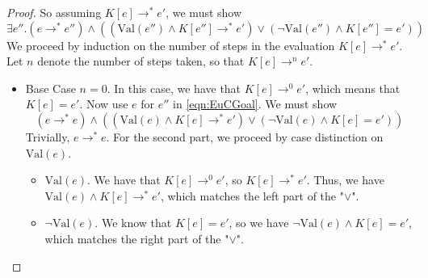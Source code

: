 \documentclass[twoside,11pt,openright]{report}
\theoremstyle{definition}
\newcommand{\expr}{e}
\newcommand{\elctx}{K}
\newcommand{\step}{\rightarrow}
\newcommand{\stepS}{\rightarrow^*}
\newcommand{\Val}[1]{\mathrm{Val}(#1)}
\begin{document}
\begin{proof}
  So assuming $\elctx[\expr] \stepS \expr'$, we must show
  \begin{equation}\label{eqn:EuCGoal}
    \exists \expr'' . (\expr \stepS \expr'') \land 
    \left( (\Val{\expr''} \land \elctx[\expr''] \stepS \expr') \lor
    (\neg \Val{\expr''} \land \elctx[\expr''] = \expr') \right)
  \end{equation}
  We proceed by induction on the number of steps in the evaluation $\elctx[\expr] \stepS \expr'$. Let $n$ denote the number of steps taken, so that $\elctx[\expr] \step^n \expr'$.
  \begin{itemize}
    \item Base Case $n = 0$. In this case, we have that $\elctx[\expr] \step^0 \expr'$, which means that $\elctx[\expr] = \expr'$. Now use $\expr$ for $\expr''$ in \ref{eqn:EuCGoal}. We must show
    \begin{equation*}
      (\expr \stepS \expr) \land 
      \left( (\Val{\expr} \land \elctx[\expr] \stepS \expr') \lor
      (\neg \Val{\expr} \land \elctx[\expr] = \expr') \right)
    \end{equation*}
    Trivially, $\expr \stepS \expr$. For the second part, we proceed by case distinction on $\Val{\expr}$.
    \begin{itemize}
      \item $\Val{\expr}$. We have that $\elctx[\expr] \step^0 \expr'$, so $\elctx[\expr] \stepS \expr'$. Thus, we have $\Val{\expr} \land \elctx[\expr] \stepS \expr'$, which matches the left part of the "$\lor$".
      \item $\neg \Val{\expr}$. We know that $\elctx[\expr] = \expr'$, so we have $\neg \Val{\expr} \land \elctx[\expr] = \expr'$, which matches the right part of the "$\lor$".
    \end{itemize}
    

\end{itemize}
\end{proof}
\end{document}
